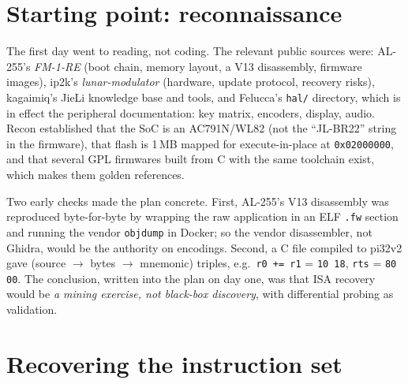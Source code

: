 \documentclass[10pt,a4paper]{article}
\newcommand{\code}[1]{\texttt{#1}}
\begin{document}
\section{Starting point: reconnaissance}

The first day went to reading, not coding. The relevant public sources were: AL-255's
\emph{FM-1-RE} (boot chain, memory layout, a V13 disassembly, firmware images), ip2k's
\emph{lunar-modulator} (hardware, update protocol, recovery risks), kagaimiq's JieLi knowledge base
and tools, and Felucca's \code{hal/} directory, which is in effect the peripheral documentation:
key matrix, encoders, display, audio. Recon established that the SoC is an AC791N/WL82 (not the
``JL-BR22'' string in the firmware), that flash is 1\,MB mapped for execute-in-place at
\code{0x02000000}, and that several GPL firmwares built from C with the same toolchain exist, which
makes them golden references.

Two early checks made the plan concrete. First, AL-255's V13 disassembly was reproduced
byte-for-byte by wrapping the raw application in an ELF \code{.fw} section and running the vendor
\code{objdump} in Docker; so the vendor disassembler, not Ghidra, would be the authority on
encodings. Second, a C file compiled to pi32v2 gave (source $\rightarrow$ bytes $\rightarrow$
mnemonic) triples, e.g.\ \code{r0 += r1} = \code{10 18}, \code{rts} = \code{80 00}. The conclusion,
written into the plan on day one, was that ISA recovery would be \emph{a mining exercise, not
black-box discovery}, with differential probing as validation.

\section{Recovering the instruction set}
\end{document}
